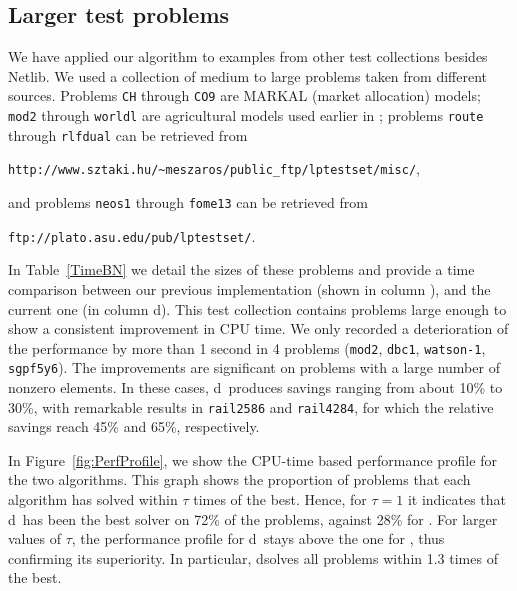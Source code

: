 %
%
\subsection{Larger test problems}
\label{BN-tests}

We have applied our algorithm to examples from other test collections 
besides Netlib.
We used a collection of medium to large problems taken from different
sources. Problems {\tt CH} through {\tt CO9}
are MARKAL (market allocation) models; {\tt mod2} through {\tt worldl} are
agricultural models used earlier in \cite{Gondzio96}; problems {\tt route}
through {\tt rlfdual} can be retrieved from 
\begin{center}
{\tt http://www.sztaki.hu/\~{}meszaros/public\_ftp/lptestset/misc/},
\end{center}
and problems {\tt neos1} through {\tt fome13} can be retrieved from 
\begin{center}
{\tt ftp://plato.asu.edu/pub/lptestset/}.
\end{center}

In Table~\ref{TimeBN} we detail the sizes of these problems and provide 
a time comparison between our previous implementation (shown in column
\HO), and the current one (in column d\HO).
This test collection contains problems large enough 
to show a consistent improvement in CPU time. 
We only recorded a deterioration of the performance by more than 1 second
in 4 problems ({\tt mod2}, {\tt dbc1}, {\tt watson-1}, {\tt sgpf5y6}).
The improvements are significant on problems with a large 
number of nonzero elements. In these cases, d\HO\
produces savings ranging from about 10\% to 30\%, with remarkable results
in {\tt rail2586} and {\tt rail4284}, for which the relative savings 
reach 45\% and 65\%, respectively.

In Figure~\ref{fig:PerfProfile}, we show the CPU-time based 
performance profile \cite{DolanMore} for the two algorithms. 
This graph shows the proportion of problems that each algorithm
has solved within $\tau$ times of the best. Hence, for
$\tau = 1$ it indicates that d\HO\ has been the best solver on 72\%
of the problems, against 28\% for \HO. For larger values of $\tau$,
the performance profile for d\HO\ stays above the one for \HO, thus
confirming its superiority. In particular, d\HO solves all problems
within 1.3 times of the best.

